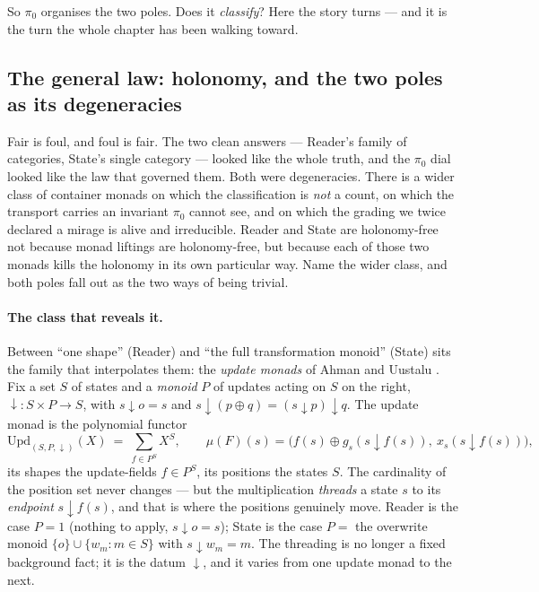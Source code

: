 \documentclass[11pt,a4paper]{book}
\theoremstyle{plain}
\theoremstyle{definition}
\theoremstyle{remark}
\begin{document}
So $\pi_{0}$ organises the two poles. Does it \emph{classify}? Here the story turns --- and it is the
turn the whole chapter has been walking toward.

\subsection{The general law: holonomy, and the two poles as its degeneracies}
\label{sec:update-liftings-holonomy}

Fair is foul, and foul is fair. The two clean answers --- Reader's family of categories, State's single
category --- looked like the whole truth, and the $\pi_{0}$ dial looked like the law that governed
them. Both were degeneracies. There is a wider class of container monads on which the classification is
\emph{not} a count, on which the transport carries an invariant $\pi_{0}$ cannot see, and on which the
grading we twice declared a mirage is alive and irreducible. Reader and State are holonomy-free not
because monad liftings are holonomy-free, but because each of those two monads kills the holonomy in
its own particular way. Name the wider class, and both poles fall out as the two ways of being trivial.

\paragraph{The class that reveals it.} Between ``one shape'' (Reader) and ``the full transformation
monoid'' (State) sits the family that interpolates them: the \emph{update monads} of Ahman and Uustalu
\cite{AhmanUustalu13}. Fix a set $S$ of states and a \emph{monoid} $P$ of updates acting on $S$ on the
right, $\downarrow\colon S\times P\to S$, with $s{\downarrow}o=s$ and
$s{\downarrow}(p\oplus q)=(s{\downarrow}p){\downarrow}q$. The update monad is the polynomial functor
\[
   \mathrm{Upd}_{(S,P,\downarrow)}(X)\ =\ \sum_{f\in P^{S}} X^{S},
   \qquad
   \mu(F)(s)=\bigl(f(s)\oplus g_{s}(s{\downarrow}f(s)),\ x_{s}(s{\downarrow}f(s))\bigr),
\]
its shapes the update-fields $f\in P^{S}$, its positions the states $S$. The cardinality of the
position set never changes --- but the multiplication \emph{threads} a state $s$ to its
\emph{endpoint} $s{\downarrow}f(s)$, and that is where the positions genuinely move. Reader is the case
$P=1$ (nothing to apply, $s{\downarrow}o=s$); State is the case $P=$ the overwrite monoid
$\{o\}\cup\{w_{m}:m\in S\}$ with $s{\downarrow}w_{m}=m$. The threading is no longer a fixed background
fact; it is the datum $\downarrow$, and it varies from one update monad to the next.
\end{document}
